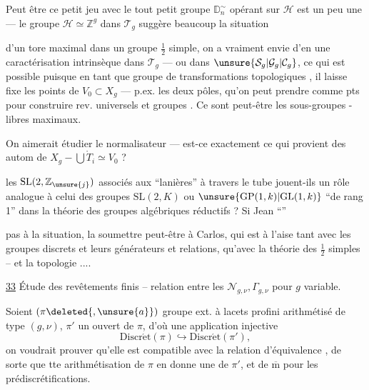 Peut être ce petit jeu avec le tout petit groupe $\mathbb D_n^{\sim}$ opérant sur $\mathcal H$ est un peu une  --- le groupe $\mathcal H\simeq\mathbb Z^g$ dans $\mathcal T_g$ suggère beaucoup la situation


d'un tore maximal dans un groupe $\frac12$ simple, on a vraiment envie d'en  une caractérisation intrinsèque dans $\mathcal T_g$ --- ou dans $\unsure{\mathcal S_g|\mathcal G_g|\mathcal C_g}$, ce qui est possible puisque  en tant que groupe de transformations topologiques , il laisse fixe les points de $V_0\subset X_g$ --- p.ex. les deux pôles, qu'on peut prendre comme pts  pour construire rev. universels et groupes . Ce sont peut-être les sous-groupes -libres maximaux.

On aimerait étudier le normalisateur --- est-ce exactement ce qui provient des autom de $X_g-\bigcup\mathring{T}_i\simeq V_0$ ?

les $\mathrm{SL}(2,\mathbb Z_{\unsure{j}})$ associés aux ``lanières'' à travers le tube  jouent-ils un rôle analogue à celui des groupes $\mathrm{SL}(2,K)$ ou $\unsure{\mathrm{GP}(1,k)|\mathrm{GL}(1,k)}$ ``de rang 1'' dans la théorie des groupes algébriques réductifs ? Si Jean  ``''


pas à la situation, la soumettre peut-être à Carlos, qui est à l'aise tant avec les groupes discrets et leurs générateurs et relations, qu'avec la théorie des $\frac{1}{2}$ simples -- et la topologie ....

\uline{33} Étude des revêtements finis -- relation entre les $\mathcal N_{g,\nu},\Gamma_{g,\nu}$ pour $g$ variable.

Soient $(\pi\deleted{,\unsure{a}})$ groupe ext. à lacets profini arithmétisé de type $(g,\nu)$, $\pi'$ un  ouvert de $\pi$, d'où une application injective
\[
\mathrm{Discr\acute{e}t}(\pi)\hookrightarrow
\mathrm{Discr\acute{e}t}(\pi'),
\]
on voudrait prouver qu'elle est compatible avec la relation d'équivalence , de  sorte que tte arithmétisation de $\pi$ en donne une de $\pi'$, et de $\overline{\mathrm m}$ pour les  prédiscrétifications.


